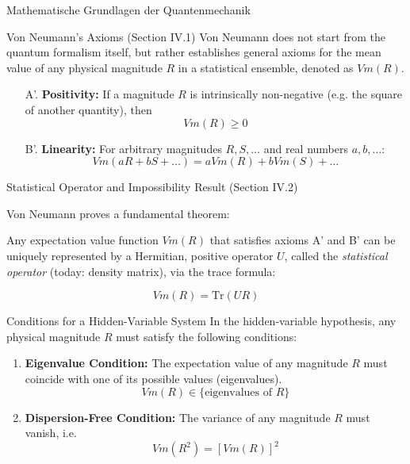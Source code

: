 \begin{frame}{Mathematische Grundlagen der Quantenmechanik}
\begin{minipage}{0.44\textwidth}
  \end{minipage}
\end{frame}

\begin{frame}{Von Neumann's Axioms (Section IV.1)}
  Von Neumann does not start from the quantum formalism itself, 
  but rather establishes general axioms for the mean value of any 
  physical magnitude $R$ in a statistical ensemble, denoted as $Vm(R)$.  

  \pause
  \begin{itemize}
    \item[A'.] \textbf{Positivity:}  
    If a magnitude $R$ is intrinsically non-negative (e.g. the square of another quantity), then  
    \[
    Vm(R) \geq 0
    \]

    \pause
    \item[B'.] \textbf{Linearity:}  
    For arbitrary magnitudes $R, S, \dots$ and real numbers $a, b, \dots$:  
    \[
    Vm(aR + bS + \dots) = aVm(R) + bVm(S) + \dots
    \]
  \end{itemize}
\end{frame}

\begin{frame}{Statistical Operator and Impossibility Result (Section IV.2)}
 
  Von Neumann proves a fundamental theorem:  

  \pause
  Any expectation value function $Vm(R)$ that satisfies axioms A' and B' 
  can be uniquely represented by a Hermitian, positive operator $U$, 
  called the \textit{statistical operator} (today: density matrix), via the trace formula:

  \pause
  \[
    Vm(R) = \mathrm{Tr}(UR)
  \]
\end{frame}

\begin{frame}{Conditions for a Hidden-Variable System}
  In the hidden-variable hypothesis, any physical magnitude $R$ 
  must satisfy the following conditions:

  \pause
  \begin{enumerate}
    \item \textbf{Eigenvalue Condition:}  
    The expectation value of any magnitude $R$ must coincide with one of its possible values (eigenvalues).  
    \[
      Vm(R) \in \{\text{eigenvalues of } R\}
    \]

    \pause
    \item \textbf{Dispersion-Free Condition:}  
    The variance of any magnitude $R$ must vanish, i.e.  
    \[
      Vm(R^2) = [Vm(R)]^2
    \]
  \end{enumerate}
\end{frame}

